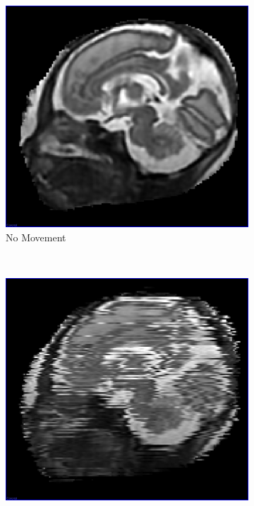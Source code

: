 \begin{figure}[H]
  \centering
  \begin{subfigure}[b]{0.32\textwidth}
    \includegraphics[width=\textwidth]{images/scan_simulation/scan_simulation_no_movement.png}
    \caption{No Movement}\label{fig:scan_simulation_no_movement}
  \end{subfigure}%
  ~ %
  \begin{subfigure}[b]{0.32\textwidth}
    \includegraphics[width=\textwidth]{images/scan_simulation/scan_simulation_5.png}

\end{subfigure}
\end{figure}

